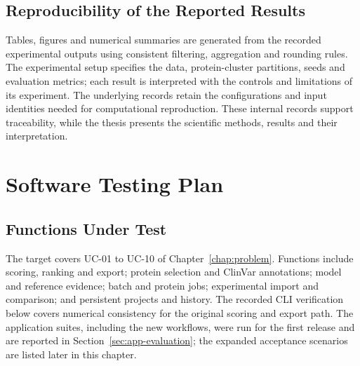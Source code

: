 \subsection{Reproducibility of the Reported Results}
Tables, figures and numerical summaries are generated from the recorded experimental outputs using
consistent filtering, aggregation and rounding rules. The experimental setup specifies the data,
protein-cluster partitions, seeds and evaluation metrics; each result is interpreted with the controls
and limitations of its experiment. The underlying records retain the configurations and input identities
needed for computational reproduction. These internal records support traceability, while the thesis
presents the scientific methods, results and their interpretation.



\section{Software Testing Plan}\label{sec:testplan}
\subsection{Functions Under Test}
The target covers UC-01 to UC-10 of Chapter~\ref{chap:problem}. Functions include scoring, ranking
and export; protein selection and ClinVar annotations; model and reference evidence; batch and
protein jobs; experimental import and comparison; and persistent projects and history. The recorded CLI verification below
covers numerical consistency for the original scoring and export path. The application suites,
including the new workflows, were run for the first release and are reported in
Section~\ref{sec:app-evaluation}; the expanded acceptance scenarios are listed later in this chapter.
